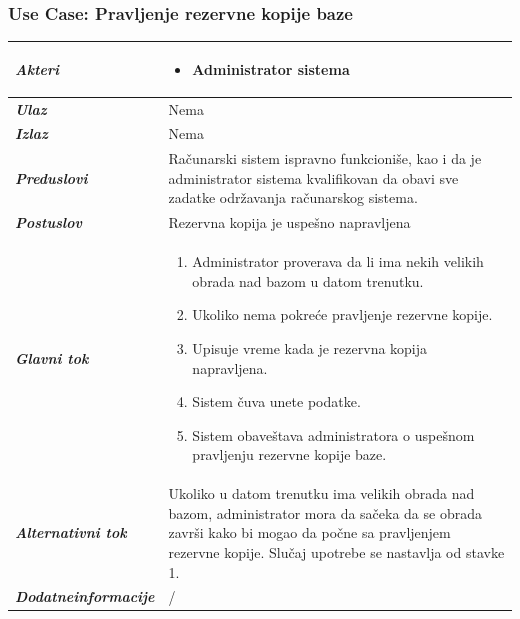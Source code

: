 \documentclass[20pt]{article}
\begin{document}
\subsubsection{\bfseries Use Case: Pravljenje rezervne kopije baze}
\begin{center}
\begin{tabular}{p{0.23\linewidth} p{0.77\linewidth}}
 \hline
 {\it \bfseries Akteri} & \begin{itemize}
    \item Administrator sistema
\end{itemize}\\
\hline

 {\it \bfseries Ulaz} & Nema\\
 \hline
 
 {\it \bfseries Izlaz} & Nema\\
 \hline
 
 {\it \bfseries Preduslovi} & Ra\v {c}unarski sistem ispravno funkcioni\v {s}e, kao i da je administrator sistema kvalifikovan da obavi sve zadatke odr\v {z}avanja ra\v {c}unarskog sistema.\\
 \hline
 
 {\it \bfseries Postuslov} & Rezervna kopija je uspe\v {s}no napravljena\\
 \hline

     {\it \bfseries Glavni tok} &  
     \begin{enumerate}
         \item Administrator proverava da li ima nekih velikih obrada nad bazom u datom trenutku.
         \item Ukoliko nema pokre\' ce pravljenje rezervne kopije.
         \item Upisuje vreme kada je rezervna kopija napravljena.
         \item Sistem \v {c}uva unete podatke.
         \item Sistem obave\v {s}tava administratora o uspe\v {s}nom pravljenju rezervne kopije baze.
    \end{enumerate}\\
 \hline
 {\it \bfseries Alternativni tok} & Ukoliko u datom trenutku ima velikih obrada nad bazom, administrator mora da sa\v {c}eka da se obrada zavr\v {s}i kako bi mogao da po\v {c}ne sa pravljenjem rezervne kopije. Slu\v {c}aj upotrebe se nastavlja od stavke 1.\\
 \hline
 {\it \bfseries Dodatne\newline informacije} & /\\
 \hline
\end{tabular}
\end{center}
\newpage
\end{document}
